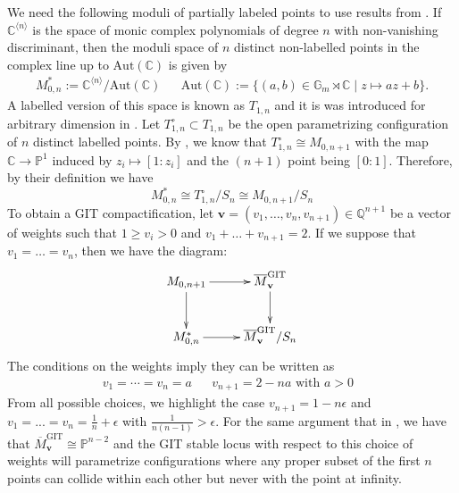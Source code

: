 \documentclass[12pt, letterpaper]{amsart}
\theoremstyle{plain}
\theoremstyle{definition}
\begin{document}
We need the following moduli of partially labeled points to use results from  \cite[Sec 2]{McM13}. If $\mathbb{C}^{\langle n \rangle} $ is the space of monic complex polynomials of degree $n$ with non-vanishing discriminant,
then the moduli space of $n$ distinct non-labelled points in the complex line up to 
$\mathrm{Aut}(\mathbb C)$ is given by
\begin{align}\label{eq:PointsAffineLine}
M_{0,n}^* := \mathbb{C}^{\langle n \rangle} /
\mathrm{Aut}(\mathbb C)
&&
\mathrm{Aut}(\mathbb C):= \{ (a,b) 
\in \mathbb{G}_m \rtimes \mathbb{C}
\; | \; z \mapsto az +b\}.
\end{align}
A labelled version of this space  is known as $T_{1,n}$ and it is was introduced for arbitrary dimension in  \cite{chen2009pointed}.
Let $T_{1,n}^{\circ} \subset T_{1,n}$ be the open parametrizing configuration of $n$ distinct labelled points. 
By \cite[Prop 3.4.3]{chen2009pointed}, we know that $T_{1,n}^{\circ} \cong M_{0,n+1}$
with the map  $\mathbb{C} \to \mathbb{P}^1$
induced by  $z_i \mapsto [1:z_i]$ and the $(n+1)$ point being $[0:1]$. 
Therefore, by their definition we have
$$
M_{0,n}^* \cong T_{1,n}^{\circ}/S_n
\cong
M_{0,n+1}/S_n
$$
To obtain a GIT compactification, let 
$\mathbf{v} = (v_1, \ldots, v_n, v_{n+1}) \in \mathbb{Q}^{n+1}$ be a vector of weights such that $1 \geq v_i > 0$ and $v_1 + \ldots + v_{n+1}=2$. If we suppose that $v_1=\ldots = v_n$, then we have the diagram:
\begin{align*}
\xymatrix{
M_{0,n+1} \ar[d] \ar[r] &  \overline{M}^{\mathrm{GIT}}_{\mathbf{v}} \ar[d]
 \\
M_{0,n}^* \ar[r] & \overline{M}^{\mathrm{GIT}}_{\mathbf{v}}/S_n
  }  
\end{align*}
The conditions on the weights imply they can be written as 
\begin{align*}
v_1 = \cdots = v_n = a
&&
v_{n+1} = 2-na
\text{ with $a > 0$ }
\end{align*}
From all possible choices, we highlight the case $v_{n+1}=1-n\epsilon$ and $v_1=...=v_n=\frac{1}{n} + \epsilon$
with  $\frac{1}{n(n-1)}  > \epsilon$.
For the same argument that in \cite[Lemma 4.13]{gallardo2017wonderful},  we have that 
$\overline{M}^{\mathrm{GIT}}_{\mathbf{v}} \cong \mathbb{P}^{n-2}$ and the GIT stable locus with respect to this choice of weights will parametrize configurations where any proper subset of the first $n$ points can collide within each other but never with the point at infinity.
\end{document}
